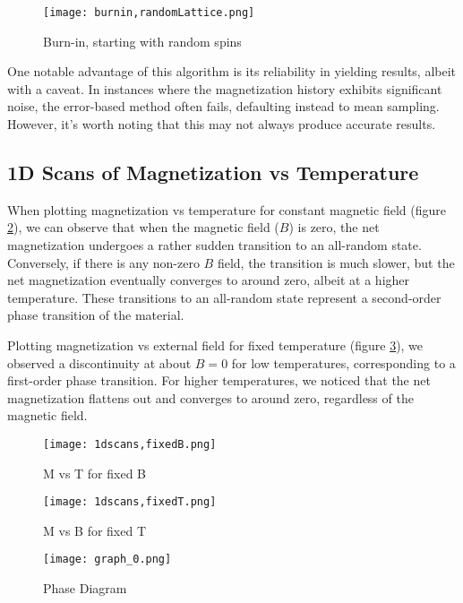 \documentclass[%
 reprint,
 amsmath,amssymb,
 aps,
]{revtex4-2}
\begin{document}
\begin{figure}
    \centering
    \texttt{[image: burnin,randomLattice.png]}
    \caption{Burn-in, starting with random spins}
    \label{fig:burnin,randomLattice}
\end{figure}

One notable advantage of this algorithm is its reliability in yielding results, albeit with a caveat. In instances where the magnetization history exhibits significant noise, the error-based method often fails, defaulting instead to mean sampling. However, it's worth noting that this may not always produce accurate results.

\subsection{\label{sec:level2}1D Scans of Magnetization vs Temperature}
When plotting magnetization vs temperature for constant magnetic field (figure \ref{fig:1dscans,fixedB}), we can observe that when the magnetic field (\(B\)) is zero, the net magnetization undergoes a rather sudden transition to an all-random state. Conversely, if there is any non-zero \(B\) field, the transition is much slower, but the net magnetization eventually converges to around zero, albeit at a higher temperature. These transitions to an all-random state represent a second-order phase transition of the material.

Plotting magnetization vs external field for fixed temperature (figure \ref{fig:1dscans,fixedT}), we observed a discontinuity at about \(B=0\) for low temperatures, corresponding to a first-order phase transition. For higher temperatures, we noticed that the net magnetization flattens out and converges to around zero, regardless of the magnetic field.

\begin{figure}
    \centering
    \texttt{[image: 1dscans,fixedB.png]}
    \caption{M vs T for fixed B}
    \label{fig:1dscans,fixedB}
\end{figure}

\begin{figure}
    \centering
    \texttt{[image: 1dscans,fixedT.png]}
    \caption{M vs B for fixed T}
    \label{fig:1dscans,fixedT}
\end{figure}

\begin{figure}
    \centering
    \texttt{[image: graph\_0.png]}
    \caption{Phase Diagram}
    \label{fig:phase-diagram}
\end{figure}
\end{document}
